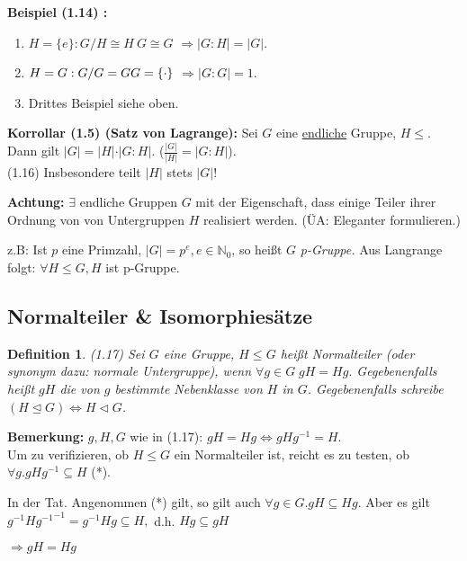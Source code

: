 \documentclass[10pt,a4paper]{article}
\newtheorem{defi}{Definition}
\begin{document}
\textbf{Beispiel (1.14) :} \begin{enumerate}
\item $H = \{ e \}: G/H \cong H \ G \cong G$ %
$\Rightarrow \vert G : H\vert = \vert G \vert$.
\item $H = G: G/G = G\\G = \{\cdot\}$ %
$\Rightarrow \vert G : G\vert = 1$.
\item Drittes Beispiel siehe oben.
\end{enumerate}

\textbf{Korrollar (1.5) (Satz von Lagrange):} Sei $G$ eine \underline{endliche} Gruppe, $H \leqslant$. Dann gilt $\vert G\vert = \vert H \vert \cdot \vert G : H \vert$. ($\frac{\vert G\vert}{\vert H \vert} = \vert G : H \vert$).\\ (1.16) Insbesondere teilt $\vert H \vert$ stets $\vert G\vert$!

\textbf{Achtung:} $\exists$ endliche Gruppen $G$ mit der Eigenschaft, dass einige Teiler ihrer Ordnung von von Untergruppen $H$ realisiert werden. (ÜA: Eleganter formulieren.)

z.B: Ist $p$ eine Primzahl, $\vert G\vert = p^e, e \in \mathbb{N}_0$, so heißt $G$ \emph{p-Gruppe.} Aus Langrange folgt: $\forall H \leqslant G, H$ ist p-Gruppe.

\subsection{Normalteiler \& Isomorphiesätze}

\begin{defi}(1.17)
Sei $G$ eine Gruppe, $H \leqslant G$ heißt \emph{Normalteiler} (oder synonym dazu: normale Untergruppe), wenn $\forall g \in G\; gH = Hg.$
Gegebenenfalls heißt $gH$ die von $g$ bestimmte Nebenklasse von $H$ in $G$. Gegebenenfalls schreibe $(H \trianglelefteq G) \Leftrightarrow H \triangleleft G$.
\end{defi}

\textbf{Bemerkung:} $g, H, G$ wie in (1.17): $gH = Hg \Leftrightarrow g H g^{-1} = H$.\\
Um zu verifizieren, ob $H \leqslant G$ ein Normalteiler ist, reicht es zu testen, ob $\forall g. g H g^{-1} \subseteq H$ (*).

In der Tat. Angenommen (*) gilt, so gilt auch $\forall g \in G. gH \subseteq Hg$. Aber es gilt $g^{-1}H{g^{-1}}^{-1} = g^{-1}Hg \subseteq H, $ d.h. $Hg \subseteq gH$

$\Rightarrow gH = Hg$ %
\end{document}
